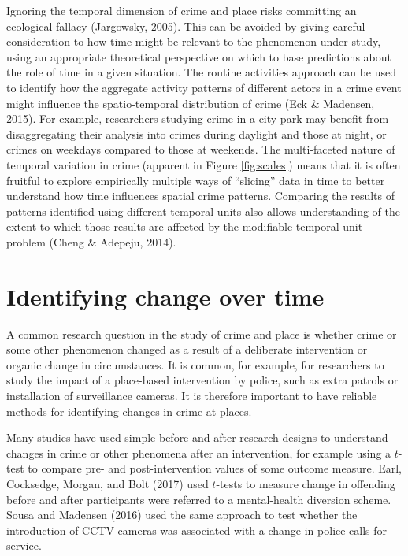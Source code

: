 \documentclass[
  english,
  man,a4paper,mask,floatsintext]{apa6}
\begin{document}
Ignoring the temporal dimension of crime and place risks committing an ecological fallacy (Jargowsky, 2005). This can be avoided by giving careful consideration to how time might be relevant to the phenomenon under study, using an appropriate theoretical perspective on which to base predictions about the role of time in a given situation. The routine activities approach can be used to identify how the aggregate activity patterns of different actors in a crime event might influence the spatio-temporal distribution of crime (Eck \& Madensen, 2015). For example, researchers studying crime in a city park may benefit from disaggregating their analysis into crimes during daylight and those at night, or crimes on weekdays compared to those at weekends. The multi-faceted nature of temporal variation in crime (apparent in Figure \ref{fig:scales}) means that it is often fruitful to explore empirically multiple ways of \enquote{slicing} data in time to better understand how time influences spatial crime patterns. Comparing the results of patterns identified using different temporal units also allows understanding of the extent to which those results are affected by the modifiable temporal unit problem (Cheng \& Adepeju, 2014).

\hypertarget{identifying-change-over-time}{%
\section{Identifying change over time}\label{identifying-change-over-time}}

A common research question in the study of crime and place is whether crime or some other phenomenon changed as a result of a deliberate intervention or organic change in circumstances. It is common, for example, for researchers to study the impact of a place-based intervention by police, such as extra patrols or installation of surveillance cameras. It is therefore important to have reliable methods for identifying changes in crime at places.

Many studies have used simple before-and-after research designs to understand changes in crime or other phenomena after an intervention, for example using a \(t\)-test to compare pre- and post-intervention values of some outcome measure. Earl, Cocksedge, Morgan, and Bolt (2017) used \(t\)-tests to measure change in offending before and after participants were referred to a mental-health diversion scheme. Sousa and Madensen (2016) used the same approach to test whether the introduction of CCTV cameras was associated with a change in police calls for service.
\end{document}
